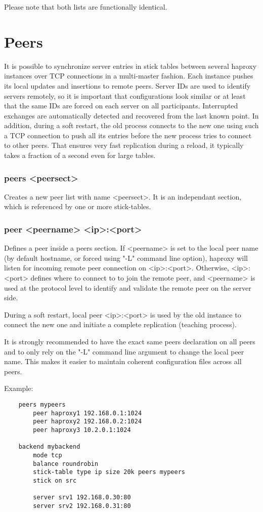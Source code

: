   Please note that both lists are functionally identical.


\section{Peers}

It is possible to synchronize server entries in stick tables between several
haproxy instances over TCP connections in a multi-master fashion. Each instance
pushes its local updates and insertions to remote peers. Server IDs are used to
identify servers remotely, so it is important that configurations look similar
or at least that the same IDs are forced on each server on all participants.
Interrupted exchanges are automatically detected and recovered from the last
known point. In addition, during a soft restart, the old process connects to
the new one using such a TCP connection to push all its entries before the new
process tries to connect to other peers. That ensures very fast replication
during a reload, it typically takes a fraction of a second even for large
tables.

\subsubsection[peers]{peers <peersect>}
  Creates a new peer list with name <peersect>. It is an independant section,
  which is referenced by one or more stick-tables.

\subsubsection[peer]{peer <peername> <ip>:<port>}
  Defines a peer inside a peers section.
  If <peername> is set to the local peer name (by default hostname, or forced
  using "-L" command line option), haproxy will listen for incoming remote peer
  connection on <ip>:<port>. Otherwise, <ip>:<port> defines where to connect to
  to join the remote peer, and <peername> is used at the protocol level to
  identify and validate the remote peer on the server side.

  During a soft restart, local peer <ip>:<port> is used by the old instance to
  connect the new one and initiate a complete replication (teaching process).

  It is strongly recommended to have the exact same peers declaration on all
  peers and to only rely on the "-L" command line argument to change the local
  peer name. This makes it easier to maintain coherent configuration files
  across all peers.

  Example:
\begin{verbatim}
    peers mypeers
        peer haproxy1 192.168.0.1:1024
        peer haproxy2 192.168.0.2:1024
        peer haproxy3 10.2.0.1:1024

    backend mybackend
        mode tcp
        balance roundrobin
        stick-table type ip size 20k peers mypeers
        stick on src

        server srv1 192.168.0.30:80
        server srv2 192.168.0.31:80
\end{verbatim}